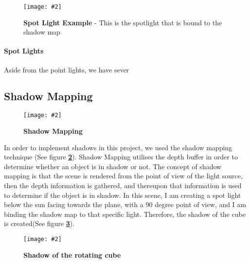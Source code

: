 \documentclass[10pt, a4paper]{article}
\newcommand{\figuremacro}[5]{
    \begin{figure}[#1]
        \centering
        \texttt{[image: \#2]}
        \caption[#3]{\textbf{#3}#4}
        \label{fig:#2}
    \end{figure}
}
\begin{document}
	\figuremacro{H}{Spotlight_Shadow}{Spot Light Example}{ - This is the spotlight that is bound to the shadow map}{1.0}
	
	\paragraph{Spot Lights} Aside from the point lights, we have sever
	



\subsection{Shadow Mapping}

	\figuremacro{H}{Shadow_Explanation}{Shadow Mapping}{ }{1.0}
	
	In order to implement shadows in this project, we used the shadow mapping technique (See figure \textbf{\ref{fig:Shadow_Explanation}}). Shadow Mapping utilises the depth buffer in order to determine whether an object is in shadow or not. The concept of shadow mapping is that the scene is rendered from the point of view of the light source, then the depth information is gathered, and thereupon that information is used to determine if the object is in shadow. In this scene, I am creating a spot light below the sun facing towards the plane, with a 90 degree point of view, and I am binding the shadow map to that specific light. Therefore, the shadow of the cube is created(See figure \textbf{\ref{fig:Cube_Shadow}}).
	
	
	\figuremacro{H}{Cube_Shadow}{Shadow of the rotating cube}{ }{1.0}






		
\end{document}
